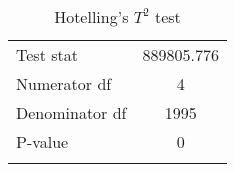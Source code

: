 \begin{table}[h]
\centering
\caption{Hotelling's $T^2$ test}\label{tab:hotelling}
\begin{tabular}{lc}
 \hline 
Test stat &889805.776\\
Numerator df & 4\\
Denominator df & 1995\\
P-value & 0\\\hline\\
\end{tabular}
\end{table}

